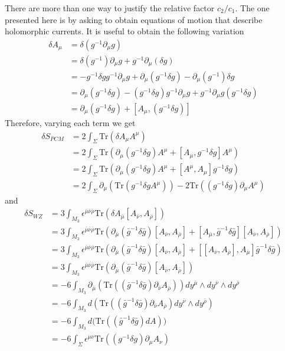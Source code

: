 \documentclass[a4paper,12pt]{article}
\numberwithin{equation}{section}
\numberwithin{thm}{section}
\numberwithin{exm}{section}
\newcommand{\p}{\partial}
\newcommand{\tr}{\mathrm{Tr}}
\newcommand{\wt}{\widetilde}
\newcommand{\mo}{^{-1}}
\newcommand{\we}{{\wedge}}
\newcommand{\<}{{\langle}}
\renewcommand{\>}{{\rangle}}
\renewcommand{\d}{{\delta}}
\newcommand{\e}{{\epsilon}}
\newcommand{\m}{{\mu}}
\newcommand{\n}{{\nu}}
\renewcommand{\S}{{\Sigma}}
\newcommand{\bm}{{\bar\mu}}
\newcommand{\bn}{{\bar\nu}}
\newcommand{\br}{{\bar\rho}}
\newcommand{\mb}{{\bar\mu}}
\newcommand{\nb}{{\bar\nu}}
\newcommand{\rb}{{\bar\rho}}
\begin{document}
There are more than one way to justify the relative factor $c_2/c_1$. The one presented here is by asking to obtain equations of motion that describe holomorphic currents. It is useful to obtain the following variation
	\begin{align}
	\d A_\m & = \d(g\mo \p_\m g) \nonumber \\
	& = \d(g\mo)\p_\m g + g\mo\p_\m(\d g) \nonumber \\
	& = -g\mo \d g g\mo \p_\m g + \p_\m (g\mo\d g) - \p_\m (g\mo) \d g \nonumber \\
	& = \p_\m(g^{-1}\delta g) - (g^{-1}\delta g) g^{-1}\p_\mu g + g\mo\p_\m g (g\mo\d g) \nonumber \\
	& = \p_\m(g\mo\d g) + [A_\m,(g\mo\d g)]
	\end{align}
Therefore, varying each term we get
	\begin{align}
	\d S_{PCM} & = 2\int_\S \tr(\d A_\m A^\m) \nonumber \\
	&=2\int_\S \tr(\p_\m(g\mo\d g) A^\m + [A_\m, g\mo\d g]A^\m) \nonumber \\
	&=2\int_\S \tr(\p_\m(g^{-1}\d g) A^\m + [A^\m, A_\m] g^{-1}\d g) \nonumber \\
	&=2\int_\S \p_\m(\tr(g^{-1}\d g A^\m)) - 2\tr((g^{-1}\d g)\p_\mu A^\m)
	\end{align}
and
	\begin{align}
	\delta S_{WZ}&=3\int_{M_3} \e^{\mb\nb\rb}\tr(\d A_\mb [A_\nb,A_\rb]) \nonumber \\
	&=3\int_{M_3} \e^{\mb\nb\rb}\tr(\p_\bm(\bar g^{-1}\d\bar g)[A_\bn,A_\br] + [A_\bm,\bar g^{-1}\d\bar g][A_\bn,A_\br]) \nonumber \\
	&=3\int_{M_3} \e^{\mb\nb\rb}\tr(\p_\bm(\bar g^{-1}\d\bar g)[A_\bn,A_\br] + [[A_\bn,A_\br],A_\bm]\bar g^{-1}\d\bar g) \nonumber \\
	&=3\int_{M_3} \e^{\mb\nb\rb}\tr(\p_\bm(\bar g^{-1}\delta\bar g)[A_\bn,A_\br]) \nonumber \\
	& = -6 \int_{M_3} \p_\mb(\tr((\bar g^{-1}\delta\bar g)\p_\bn A_\br)) dy^\mb\we dy^\nb\we dy^\rb \nonumber \\
	& = -6 \int_{M_3} d(\tr((\bar g^{-1}\d\bar g)\p_\bn A_\br)dy^\nb\we dy^\rb) \nonumber \\
	& = -6 \int_{M_3} d\Big( \tr((\bar g^{-1}\d\bar g)dA) \Big) \nonumber \\
	&=-6\int_\S \e^{\m\n}\tr((g^{-1}\delta g) \p_\mu A_\nu)
	\end{align}
\end{document}
